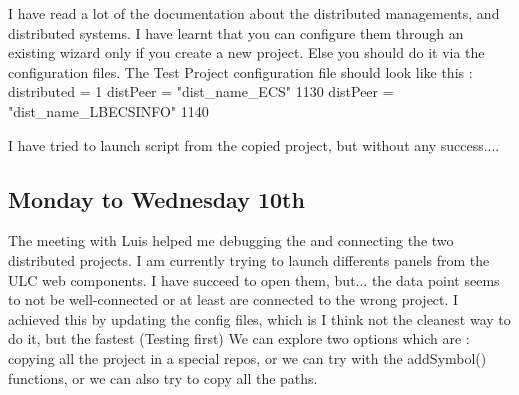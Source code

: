 \documentclass[a4paper, 10pt]{article}
\begin{document}
I have read a lot of the documentation about the distributed managements, and distributed systems.  I have learnt that you can configure them through an existing wizard only if you create a new project. Else you should do it via the configuration files. The Test Project configuration file should look like this :\newline
[general]\newline
distributed = 1\newline
[dist]\newline
distPeer = "dist\_name\_ECS" 1130\newline
distPeer = "dist\_name\_LBECSINFO" 1140\newline

I have tried to launch script from the copied project, but without any success....

\subsection*{Monday to Wednesday 10th}
The meeting with Luis helped me debugging the and connecting the two distributed projects. I am currently trying to launch differents panels from the ULC web components.
I have succeed to open them, but... the data point seems to not be well-connected or at least are connected to the wrong project.
I achieved this by updating the config files, which is I think not the cleanest way to do it, but the fastest (Testing first)
We can explore two options which are : copying all the project in a special repos, or we can try with the addSymbol() functions, or we can also try to copy all the paths.



\normalsize
\end{document}
